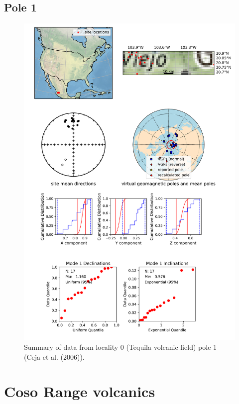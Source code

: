 \subsection{Pole 1}


\begin{figure}[H]
\centering
\includegraphics[width=5 in]{./0/1/pole_summary.png}
\caption{Summary of data from locality 0 (Tequila volcanic field) pole 1 (Ceja et al. (2006)).}
\end{figure}

\section{Coso Range volcanics}
